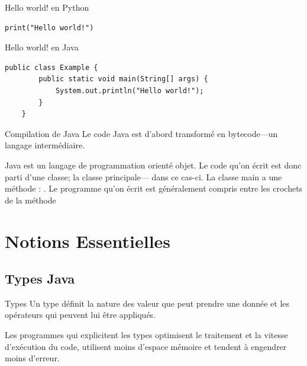 \documentclass{report}
\begin{document}
\begin{EExample*}{Hello world! en Python}{}
\begin{lstlisting}[style=PythonDraculaWhite]	
print("Hello world!")
\end{lstlisting}
\end{EExample*}

\begin{EExample*}{Hello world! en Java}{}
\begin{lstlisting}[style=JavaDraculaWhite]
	public class Example {
		public static void main(String[] args) {
			System.out.println("Hello world!");
		}
	}
\end{lstlisting}\end{EExample*}


\begin{Concept*}{Compilation de Java}
	Le code Java est d'abord transformé en bytecode—un langage intermédiaire.

\end{Concept*}
 
\noindent Java est un langage de programmation orienté objet. Le code qu'on écrit est donc parti d'une classe; la classe principale—
 dans ce cas-ci. La classe main a une méthode : . Le programme qu'on écrit est généralement compris entre les crochets de
la méthode 
% 
\chapter{Notions Essentielles}
\section{Types Java}
\begin{DefG*}{Types}{}
	Un type définit la nature des valeur que peut prendre une donnée et les opérateurs qui peuvent lui être 
	appliqués. 
\end{DefG*}
 

\begin{note}
Les programmes qui explicitent les types optimisent le traitement et la vitesse d'exécution du code,
utilisent moins d'espace mémoire et tendent à engendrer moins d'erreur.
\end{note}
\end{document}
